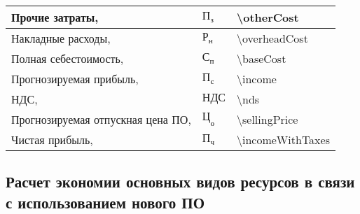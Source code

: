 \begin{table}[!h!t]
\begin{tabular}{| >{\raggedright}m{} 
                  | >{\centering}m{} 
                  | >{\centering\arraybackslash}m{}|}
    \hline
    Прочие затраты, \byr{} & $ \text{П}_\text{з} $ & \num{\otherCost} \\

    \hline
    Накладные расходы, \byr{} & $ \text{Р}_\text{н} $ & \num{\overheadCost} \\



    \hline
    Полная себестоимость, \byr{} & $ \text{С}_\text{п} $ & \num{\baseCost} \\

    \hline
    Прогнозируемая прибыль, \byr{} & $ \text{П}_\text{с} $ & \num{\income} \\

    \hline
    НДС, \byr{} & $ \text{НДС} $ & \num{\nds} \\

    \hline
    Прогнозируемая отпускная цена ПО, \byr{} & $ \text{Ц}_\text{о} $ & \num{\sellingPrice} \\

    \hline
    Чистая прибыль, \byr{} & $ \text{П}_\text{ч} $ & \num{\incomeWithTaxes} \\

    \hline
  \end{tabular}
\end{table}
\hfill
\clearpage

\subsection{Расчет экономии основных видов ресурсов в связи с использованием нового ПО}


\FPeval{\salaryEconTaskExact}{ (\avgProgrammerSalary * (\avgWorkBefore - \avgWorkAfter)) / (\clientWorkingHoursInDay * \avgWorkingDaysInMonth) }

\FPeval{\salaryEconExact}{ \salaryEconTask * \tasksInYear }

